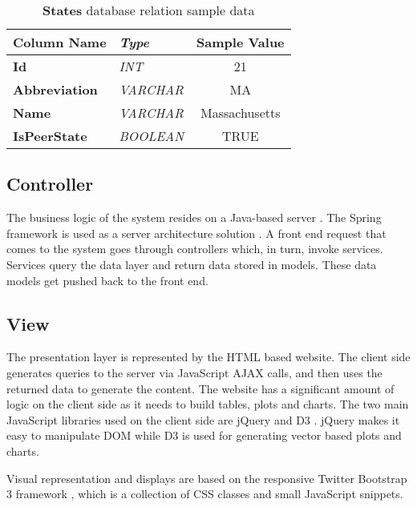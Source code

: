 			\begin{table}[h]
				\centering
				\begin{tabularx}{\textwidth}{@{} >{\bf}Y >{\em}l c @{}} %
					\toprule
					Column Name		& Type		& Sample Value	\\
					\midrule
					
					Id				& INT		& 21			\\
					Abbreviation	& VARCHAR	& MA			\\
					Name			& VARCHAR	& Massachusetts	\\
					IsPeerState		& BOOLEAN	& TRUE			\\
					
					\bottomrule
				\end{tabularx}
				\caption{\textbf{States} database relation sample data}
				\label{tbl:statestable}
			\end{table}
			
		\subsection{Controller}
		
			The business logic of the system resides on a Java-based server \cite{java}. 
			The Spring framework is used as a server architecture solution \cite{spring}. A front 
			end request that comes to the system goes through controllers which, 
			in turn, invoke services. Services query the data layer and return 
			data stored	in models. These data models get pushed back to the 
			front end.
			
		\subsection{View}
			
			The presentation layer is represented by the HTML based website. The
			client side generates queries to the server via JavaScript AJAX 
			calls, and then uses the returned data to generate the content. The 
			website has a significant amount of logic on the client side as it 
			needs to build tables, plots and charts. The two main JavaScript 
			libraries used on the client side are jQuery \cite{jquery} and D3 
			\cite{d3}. jQuery makes it easy to manipulate DOM while D3 is used 
			for generating vector based plots and charts.
			
			Visual representation and displays are based on the responsive 
			Twitter Bootstrap 3 framework \cite{bootstrap}, which is a collection 
			of CSS classes and small JavaScript snippets. 


